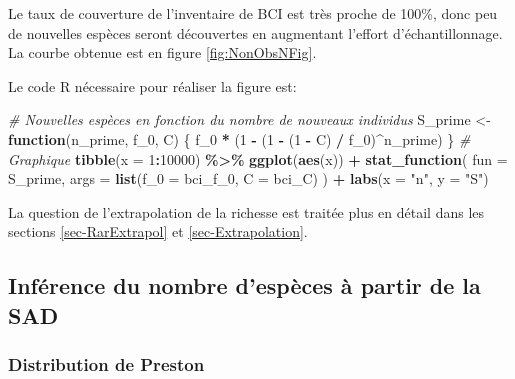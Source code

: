 \documentclass[
  11pt,
  american,
  a4paper,
  extrafontsizes,onecolumn,openright
  ]{memoir}
\newenvironment{Shaded}{\begin{snugshade}}{\end{snugshade}}
\newcommand{\AttributeTok}[1]{\textcolor[rgb]{0.13,0.29,0.53}{#1}}
\newcommand{\CommentTok}[1]{\textcolor[rgb]{0.56,0.35,0.01}{\textit{#1}}}
\newcommand{\ControlFlowTok}[1]{\textcolor[rgb]{0.13,0.29,0.53}{\textbf{#1}}}
\newcommand{\DecValTok}[1]{\textcolor[rgb]{0.00,0.00,0.81}{#1}}
\newcommand{\FunctionTok}[1]{\textcolor[rgb]{0.13,0.29,0.53}{\textbf{#1}}}
\newcommand{\NormalTok}[1]{#1}
\newcommand{\OtherTok}[1]{\textcolor[rgb]{0.56,0.35,0.01}{#1}}
\newcommand{\SpecialCharTok}[1]{\textcolor[rgb]{0.81,0.36,0.00}{\textbf{#1}}}
\newcommand{\StringTok}[1]{\textcolor[rgb]{0.31,0.60,0.02}{#1}}
\begin{document}
\normalsize

Le taux de couverture de l'inventaire de BCI est très proche de 100\%, donc peu de nouvelles espèces seront découvertes en augmentant l'effort d'échantillonnage.
La courbe obtenue est en figure \ref{fig:NonObsNFig}.

Le code R nécessaire pour réaliser la figure est:

\scriptsize

\begin{Shaded}
\begin{Highlighting}[]
\CommentTok{\# Nouvelles espèces en fonction du nombre de nouveaux individus}
\NormalTok{S\_prime }\OtherTok{\textless{}{-}} \ControlFlowTok{function}\NormalTok{(n\_prime, f\_0, C) \{}
\NormalTok{  f\_0 }\SpecialCharTok{*}\NormalTok{ (}\DecValTok{1} \SpecialCharTok{{-}}\NormalTok{ (}\DecValTok{1} \SpecialCharTok{{-}}\NormalTok{ (}\DecValTok{1} \SpecialCharTok{{-}}\NormalTok{ C) }\SpecialCharTok{/}\NormalTok{ f\_0)}\SpecialCharTok{\^{}}\NormalTok{n\_prime)}
\NormalTok{\}}
\CommentTok{\# Graphique}
\FunctionTok{tibble}\NormalTok{(}\AttributeTok{x =} \DecValTok{1}\SpecialCharTok{:}\DecValTok{10000}\NormalTok{) }\SpecialCharTok{\%\textgreater{}\%} 
  \FunctionTok{ggplot}\NormalTok{(}\FunctionTok{aes}\NormalTok{(x)) }\SpecialCharTok{+} 
  \FunctionTok{stat\_function}\NormalTok{(}
    \AttributeTok{fun =}\NormalTok{ S\_prime, }
    \AttributeTok{args =} \FunctionTok{list}\NormalTok{(}\AttributeTok{f\_0 =}\NormalTok{ bci\_f\_0, }\AttributeTok{C =}\NormalTok{ bci\_C)}
\NormalTok{  ) }\SpecialCharTok{+}
  \FunctionTok{labs}\NormalTok{(}\AttributeTok{x =} \StringTok{"n\textquotesingle{}"}\NormalTok{, }\AttributeTok{y =} \StringTok{"S\textquotesingle{}"}\NormalTok{)}
\end{Highlighting}
\end{Shaded}

\normalsize

La question de l'extrapolation de la richesse est traitée plus en détail dans les sections \ref{sec-RarExtrapol} et \ref{sec-Extrapolation}.

\subsection{Inférence du nombre d'espèces à partir de la SAD}\label{infuxe9rence-du-nombre-despuxe8ces-uxe0-partir-de-la-sad}

\subsubsection{Distribution de Preston}\label{distribution-de-preston}
\end{document}
